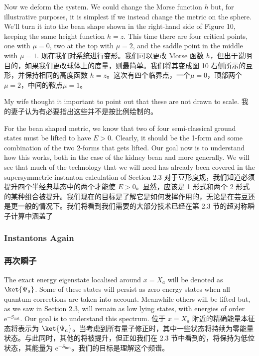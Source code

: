 \documentclass{ctexart}
\newcommand{\rme}{\mathrm{e}}
\begin{document}
\begin{paracol}{2}
Now we deform the system. We could change the Morse function $h$ but, for illustrative purposes, it is simplest if we instead change the metric on the sphere. We’ll turn it into the bean shape shown in the right-hand side of Figure 10, keeping the same height function $h = z$. This time there are four critical points, one with $\mu = 0$, two at the top with $\mu = 2$, and the saddle point in the middle with $\mu = 1$.
\switchcolumn
现在我们对系统进行变形。我们可以更改 Morse 函数 $h$，但出于说明目的，如果我们更改球体上的度量，则最简单。我们将其变成图 10 右侧所示的豆形，并保持相同的高度函数 $h = z$。这次有四个临界点，一个$\mu = 0$，顶部两个$\mu = 2$，中间的鞍点$\mu = 1$。
\switchcolumn*

My wife thought it important to point out that these are not drawn to scale.
\switchcolumn
我的妻子认为有必要指出这些并不是按比例绘制的。
\switchcolumn*

For the bean shaped metric, we know that two of four semi-classical ground states must be lifted to have $E > 0$. Clearly, it should be the 1-form and some combination of the two 2-forms that gets lifted. Our goal now is to understand how this works, both in the case of the kidney bean and more generally. We will see that much of the technology that we will need has already been covered in the supersymmetric instanton calculation of Section 2.3
\switchcolumn
对于豆形度规，我们知道必须提升四个半经典基态中的两个才能使 $E > 0$。显然，应该是 1 形式和两个 2 形式的某种组合被提升。我们现在的目标是了解它是如何发挥作用的，无论是在芸豆还是更一般的情况下。我们将看到我们需要的大部分技术已经在第 2.3 节的超对称瞬子计算中涵盖了
\switchcolumn*

\subsubsection{Instantons Again}
\switchcolumn
\subsubsection*{再次瞬子}
\switchcolumn*

The exact energy eigenstate localised around $x = X_a$ will be denoted as $\ket{\Psi_a}$. Some of these states will persist as zero energy states when all quantum corrections are taken into account. Meanwhile others will be lifted but, as we saw in Section 2.3, will remain as low lying states, with energies of order $\rme^{- S_{\text{inst}}}$. Our goal is to understand this spectrum.
\switchcolumn
位于 $x = X_a$ 附近的精确能量本征态将表示为 $\ket{\Psi_a}$。当考虑到所有量子修正时，其中一些状态将持续为零能量状态。与此同时，其他的将被提升，但正如我们在 2.3 节中看到的，将保持为低位状态，其能量为 $\rme^{- S_{\text{inst}}}$。我们的目标是理解这个频谱。
\switchcolumn*


\end{paracol}
\end{document}

